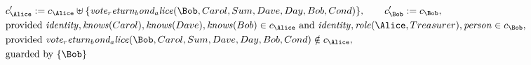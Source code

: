 \begin{align*}
&
c'_
{
\Alice
}
 := 
c_
{
\Alice
}
 \uplus 
\{
\mathit{
vote_return_bond_alice
}
(
\Bob
,
Carol
,
Sum
,
Dave
,
Day
,
Bob
,
Cond
)
\}
, \qquad 
c'_
{
\Bob
}
 := 
c_
{
\Bob
}
,\\
&
\text{provided } 
\mathit{
identity
}
,
\mathit{
knows
}
(
Carol
)
,
\mathit{
knows
}
(
Dave
)
,
\mathit{
knows
}
(
Bob
)
 \in c_
{
\Alice
}
 \text{ and } 
\mathit{
identity
}
,
\mathit{
role
}
(
\Alice
,
Treasurer
)
,
\mathit{
person
}
 \in c_
{
\Bob
}
,\\
&
\text{provided } 
\mathit{
vote_return_bond_alice
}
(
\Bob
,
Carol
,
Sum
,
Dave
,
Day
,
Bob
,
Cond
)
 \notin c_
{
\Alice
}
,\\
&
\text{guarded by } \{
\Bob
\}
\end{align*}

